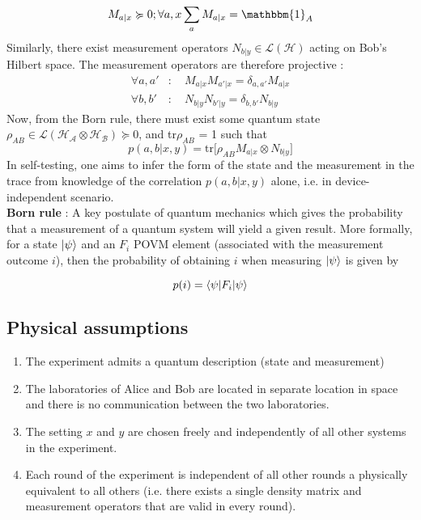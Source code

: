\documentclass[12pt]{article}
\newcommand{\tr}[1]{\text{tr}\big[#1\big]}
\begin{document}
\begin{multicols}{2}
\begin{equation}
	M_{a|x} \succcurlyeq 0 ; \forall a, x \sum_a M_{a|x} = \mathbbm{1}_A
\end{equation}
Similarly, there exist measurement operators $N_{b|y} \in \mathscr{L(H)}$ acting
on Bob's Hilbert space. The measurement operators are therefore projective :
\begin{equation}
	\begin{aligned}
		\forall a, a' & : \quad M_{a|x}M_{a'|x} = \delta_{a, a'}M_{a|x} \\
		\forall b, b' & : \quad N_{b|y}N_{b'|y} = \delta_{b, b'}N_{b|y}
	\end{aligned}
\end{equation}
Now, from the Born rule, there must exist some quantum state $\rho_{AB} \in
\mathscr{L(H_\text{A} \otimes H_\text{B})} \succcurlyeq 0$, and tr$\rho_{AB}$ =
1 such that
\begin{equation}
	p(a,b|x,y) = \tr{\rho_{AB} M_{a|x} \otimes N_{b|y}}
\end{equation}
In self-testing, one aims to infer the form of the state and the measurement in
the trace from knowledge of the correlation $p(a, b|x, y)$ alone, i.e. in
device-independent scenario.
\\\noindent
\textbf{Born rule} : A key postulate of quantum mechanics which gives the
probability that a measurement of a quantum system will yield a given result.
More formally, for a state $\ket{\psi}$ and an $F_i$ POVM element (associated
with the measurement outcome $i$), then the probability of obtaining $i$ when
measuring $\ket{\psi}$ is given by

\begin{equation}
	p(i) = \braket{\psi | F_i | \psi}
\end{equation}

\subsection*{Physical assumptions}

\begin{enumerate}
	\item The experiment admits a quantum description (state and measurement)
	\item The laboratories of Alice and Bob are located in separate location in
		space and there is no communication between the two laboratories.
	\item The setting $x$ and $y$ are chosen freely and independently of all
		other systems in the experiment.
	\item Each round of the experiment is independent of all other rounds a
		physically equivalent to all others (i.e. there exists a single density
		matrix and measurement operators that are valid in every round).
\end{enumerate}



\end{multicols}
\end{document}

